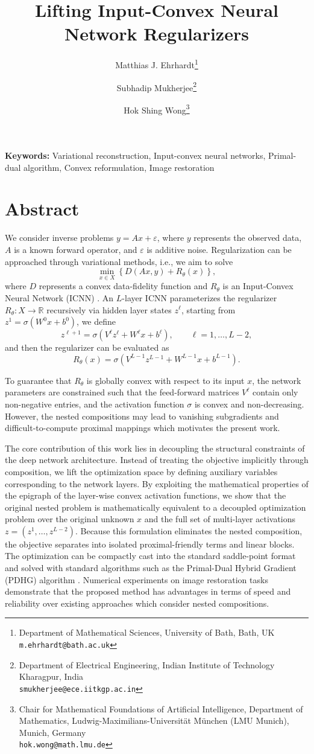 \documentclass[11pt]{article}
\title{\bfseries Lifting Input-Convex Neural Network Regularizers}
\author{
Matthias J. Ehrhardt\thanks{
Department of Mathematical Sciences,
University of Bath,
Bath, UK\\
\texttt{m.ehrhardt@bath.ac.uk}}
\and
Subhadip Mukherjee\thanks{
Department of Electrical Engineering,
Indian Institute of Technology Kharagpur,
India\\
\texttt{smukherjee@ece.iitkgp.ac.in}}
\and
Hok Shing Wong\thanks{
Chair for Mathematical Foundations of Artificial Intelligence,
Department of Mathematics,
Ludwig-Maximilians-Universität München (LMU Munich),
Munich, Germany\\
\texttt{hok.wong@math.lmu.de}}
}
\date{}
\begin{document}
\maketitle

\vspace{-1em}

\noindent
\textbf{Keywords:}
Variational reconstruction, Input-convex neural networks,
Primal-dual algorithm, Convex reformulation, Image restoration

\vspace{1em}

\section*{Abstract}

We consider inverse problems $y = Ax + \varepsilon$, where $y$ represents the observed data, $A$ is a known forward operator, and $\varepsilon$ is additive noise. Regularization can be approached through variational methods, i.e., we aim to solve 
\[
\min_{x\in X}
\left\{
D(Ax,y)+R_\theta(x)
\right\},
\]
where $D$ represents a convex data-fidelity function and
$R_\theta$ is an Input-Convex Neural Network (ICNN) \cite{Amos2017, Mukherjee2024}. An $L$-layer ICNN parameterizes the regularizer
$R_\theta : X \to \mathbb{R}$ recursively via hidden layer states
$z^\ell$, starting from $z^1=\sigma(W^0x+b^0)$, we define
\[
z^{\ell+1}
=
\sigma\!\left(
V^\ell z^\ell + W^\ell x + b^\ell
\right),
\qquad
\ell=1,\ldots,L-2,
\]
and then the regularizer can be evaluated as
\[
R_\theta(x)
=
\sigma\!\left(
V^{L-1}z^{L-1}
+
W^{L-1}x
+
b^{L-1}
\right).
\]

To guarantee that $R_\theta$ is globally convex with respect to its
input $x$, the network parameters are constrained such that the
feed-forward matrices $V^\ell$ contain only non-negative entries, and the activation function $\sigma$ is convex and non-decreasing. However, the nested compositions may lead to vanishing subgradients and difficult-to-compute proximal mappings which motivates the present work.

The core contribution of this work lies in decoupling the structural constraints of the deep network architecture. Instead of treating the objective implicitly through composition, we lift the optimization space by defining auxiliary variables corresponding to the network layers. By exploiting the mathematical properties of the epigraph of
the layer-wise convex activation functions, we show that the original nested problem is mathematically equivalent to a decoupled optimization problem over the original unknown $x$ and the full set of multi-layer activations $z=(z^1,\ldots,z^{L-2})$. Because this formulation eliminates the nested composition, the objective separates into isolated proximal-friendly terms and linear blocks.
The optimization can be compactly cast into the standard saddle-point format and solved with standard algorithms such as the Primal-Dual Hybrid Gradient (PDHG) algorithm \cite{Chambolle2011}. Numerical experiments on image restoration tasks demonstrate that the proposed method has advantages in terms of speed and reliability over existing approaches which consider nested compositions.
\end{document}

